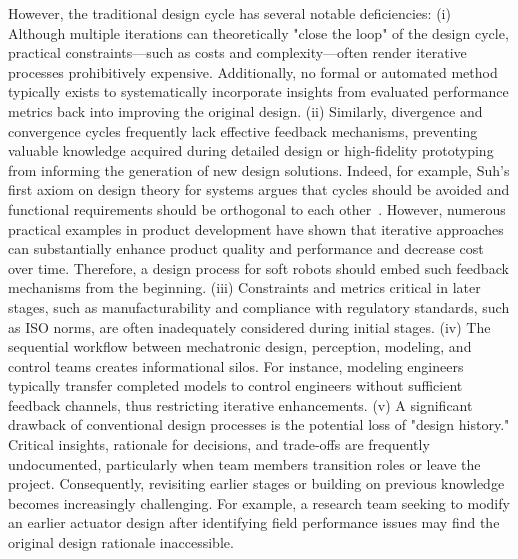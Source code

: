 However, the traditional design cycle has several notable deficiencies:
(i) Although multiple iterations can theoretically "close the loop" of the design cycle, practical constraints—such as costs and complexity—often render iterative processes prohibitively expensive. Additionally, no formal or automated method typically exists to systematically incorporate insights from evaluated performance metrics back into improving the original design.
(ii) Similarly, divergence and convergence cycles frequently lack effective feedback mechanisms, preventing valuable knowledge acquired during detailed design or high-fidelity prototyping from informing the generation of new design solutions.
Indeed, for example, Suh's first axiom on design theory for systems argues that cycles should be avoided and functional requirements should be orthogonal to each other~\citep{suh1998axiomatic}.
However, numerous practical examples in product development have shown that iterative approaches can substantially enhance product quality and performance and decrease cost over time. Therefore, a design process for soft robots should embed such feedback mechanisms from the beginning.
(iii) Constraints and metrics critical in later stages, such as manufacturability and compliance with regulatory standards, such as \gls{ISO} norms, are often inadequately considered during initial stages.
(iv) The sequential workflow between mechatronic design, perception, modeling, and control teams creates informational silos. For instance, modeling engineers typically transfer completed models to control engineers without sufficient feedback channels, thus restricting iterative enhancements.
(v) A significant drawback of conventional design processes is the potential loss of "design history." Critical insights, rationale for decisions, and trade-offs are frequently undocumented, particularly when team members transition roles or leave the project. Consequently, revisiting earlier stages or building on previous knowledge becomes increasingly challenging. For example, a research team seeking to modify an earlier actuator design after identifying field performance issues may find the original design rationale inaccessible.

